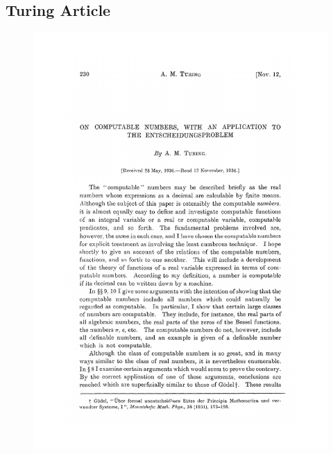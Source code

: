 \documentclass[
	12pt,				%
	openright,			%
	oneside,			%
	a4paper,			%
	chapter=TITLE,		%
	english,			%
	brazil,				%
	]{abntex2}
\begin{document}
\postextual





\begin{anexosenv}
	
	\partanexos
	
	\chapter{Turing Article}
	\label{turing_article}
	\begin{figure}[h!]
		\centering
		\includegraphics[page=1,trim={2.5cm 0 2cm 2cm},clip,scale=0.8]{anexos/turing.pdf}
	\end{figure}
	\FloatBarrier
	
\end{anexosenv}
\end{document}
